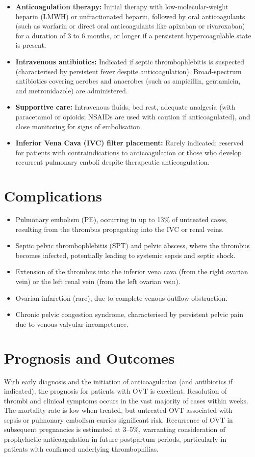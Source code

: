 \begin{itemize}
    \item \textbf{Anticoagulation therapy:} Initial therapy with low-molecular-weight heparin (LMWH) or unfractionated heparin, followed by oral anticoagulants (such as warfarin or direct oral anticoagulants like apixaban or rivaroxaban) for a duration of 3 to 6 months, or longer if a persistent hypercoagulable state is present.
    \item \textbf{Intravenous antibiotics:} Indicated if septic thrombophlebitis is suspected (characterised by persistent fever despite anticoagulation). Broad-spectrum antibiotics covering aerobes and anaerobes (such as ampicillin, gentamicin, and metronidazole) are administered.
    \item \textbf{Supportive care:} Intravenous fluids, bed rest, adequate analgesia (with paracetamol or opioids; NSAIDs are used with caution if anticoagulated), and close monitoring for signs of embolisation.
    \item \textbf{Inferior Vena Cava (IVC) filter placement:} Rarely indicated; reserved for patients with contraindications to anticoagulation or those who develop recurrent pulmonary emboli despite therapeutic anticoagulation.
\end{itemize}

\section*{Complications}
\begin{itemize}
    \item Pulmonary embolism (PE), occurring in up to 13\% of untreated cases, resulting from the thrombus propagating into the IVC or renal veins.
    \item Septic pelvic thrombophlebitis (SPT) and pelvic abscess, where the thrombus becomes infected, potentially leading to systemic sepsis and septic shock.
    \item Extension of the thrombus into the inferior vena cava (from the right ovarian vein) or the left renal vein (from the left ovarian vein).
    \item Ovarian infarction (rare), due to complete venous outflow obstruction.
    \item Chronic pelvic congestion syndrome, characterised by persistent pelvic pain due to venous valvular incompetence.
\end{itemize}

\section*{Prognosis and Outcomes}
With early diagnosis and the initiation of anticoagulation (and antibiotics if indicated), the prognosis for patients with OVT is excellent. Resolution of thrombi and clinical symptoms occurs in the vast majority of cases within weeks. The mortality rate is low when treated, but untreated OVT associated with sepsis or pulmonary embolism carries significant risk. Recurrence of OVT in subsequent pregnancies is estimated at 3--5\%, warranting consideration of prophylactic anticoagulation in future postpartum periods, particularly in patients with confirmed underlying thrombophilias.

